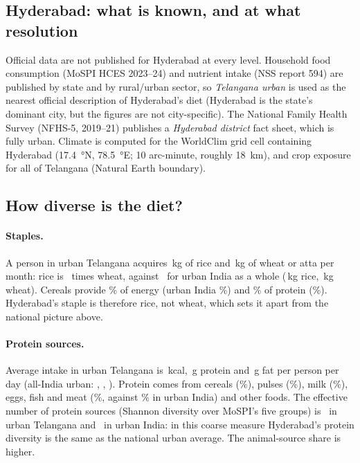 \subsection{Hyderabad: what is known, and at what resolution}
Official data are not published for Hyderabad at every level. Household food consumption (MoSPI HCES 2023--24)
and nutrient intake (NSS report 594) are published by state and by rural/urban sector, so
\emph{Telangana urban} is used as the nearest official description of Hyderabad's diet (Hyderabad is the
state's dominant city, but the figures are not city-specific). The National Family Health Survey (NFHS-5,
2019--21) publishes a \emph{Hyderabad district} fact sheet, which is fully urban. Climate is computed for the
WorldClim grid cell containing Hyderabad (\SI{17.4}{\degree}N, \SI{78.5}{\degree}E; 10 arc-minute, roughly
\SI{18}{km}), and crop exposure for all of Telangana (Natural Earth boundary).

\subsection{How diverse is the diet?}
\paragraph{Staples.} A person in urban Telangana acquires \hqTgUrbanKgRice\,kg of rice and
\hqTgUrbanKgWheat\,kg of wheat or atta per month: rice is \hqTgUrbanRiceToWheat\ times wheat, against
\hqInUrbanRiceToWheat\ for urban India as a whole (\hqInUrbanKgRice\,kg rice, \hqInUrbanKgWheat\,kg wheat). Cereals
provide \hqKcalCerealTgUrban\% of energy (urban India \hqKcalCerealInUrban\%) and \hqProtCerealTgUrban\% of protein
(\hqProtCerealInUrban\%). Hyderabad's staple is therefore rice, not wheat, which sets it apart from the national
picture above.

\paragraph{Protein sources.} Average intake in urban Telangana is \hqIntakeKcalTgUrban\,kcal,
\hqIntakeProtTgUrban\,g protein and \hqIntakeFatTgUrban\,g fat per person per day (all-India urban:
\hqIntakeKcalInUrban, \hqIntakeProtInUrban, \hqIntakeFatInUrban). Protein comes from cereals
(\hqProtCerealTgUrban\%), pulses (\hqProtPulseTgUrban\%), milk (\hqProtMilkTgUrban\%), eggs, fish and meat
(\hqProtAnimalTgUrban\%, against \hqProtAnimalInUrban\% in urban India) and other foods. The effective number of
protein sources (Shannon diversity over MoSPI's five groups) is \hqProtEffTgUrban\ in urban Telangana and
\hqProtEffInUrban\ in urban India: in this coarse measure Hyderabad's protein diversity is the same as the
national urban average. The animal-source share is higher.

